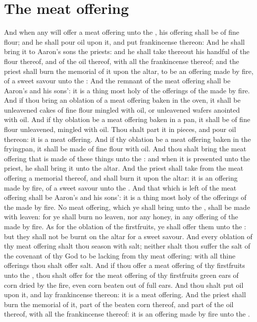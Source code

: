 \section*{The meat offering}
\begin{biblechapter} %
\verse And when any will offer a meat offering unto the \LORD, his offering shall be of fine flour; and he shall pour oil upon it, and put frankincense thereon:
\verse And he shall bring it to Aaron's sons the priests: and he shall take thereout his handful of the flour thereof, and of the oil thereof, with all the frankincense thereof; and the priest shall burn the memorial of it upon the altar, to be an offering made by fire, of a sweet savour unto the \LORD:
\verse And the remnant of the meat offering shall be Aaron's and his sons': it is a thing most holy of the offerings of the \LORD made by fire.
\verse And if thou bring an oblation of a meat offering baken in the oven, it shall be unleavened cakes of fine flour mingled with oil, or unleavened wafers anointed with oil.
\verse And if thy oblation be a meat offering baken in a pan, it shall be of fine flour unleavened, mingled with oil.
\verse Thou shalt part it in pieces, and pour oil thereon: it is a meat offering.
\verse And if thy oblation be a meat offering baken in the fryingpan, it shall be made of fine flour with oil.
\verse And thou shalt bring the meat offering that is made of these things unto the \LORD: and when it is presented unto the priest, he shall bring it unto the altar.
\verse And the priest shall take from the meat offering a memorial thereof, and shall burn it upon the altar: it is an offering made by fire, of a sweet savour unto the \LORD.
\verse And that which is left of the meat offering shall be Aaron's and his sons': it is a thing most holy of the offerings of the \LORD made by fire.
\verse No meat offering, which ye shall bring unto the \LORD, shall be made with leaven: for ye shall burn no leaven, nor any honey, in any offering of the \LORD made by fire.
\verse As for the oblation of the firstfruits, ye shall offer them unto the \LORD: but they shall not be burnt on the altar for a sweet savour.
\verse And every oblation of thy meat offering shalt thou season with salt; neither shalt thou suffer the salt of the covenant of thy God to be lacking from thy meat offering: with all thine offerings thou shalt offer salt.
\verse And if thou offer a meat offering of thy firstfruits unto the \LORD, thou shalt offer for the meat offering of thy firstfruits green ears of corn dried by the fire, even corn beaten out of full ears.
\verse And thou shalt put oil upon it, and lay frankincense thereon: it is a meat offering.
\verse And the priest shall burn the memorial of it, part of the beaten corn thereof, and part of the oil thereof, with all the frankincense thereof: it is an offering made by fire unto the \LORD.
\end{biblechapter}

